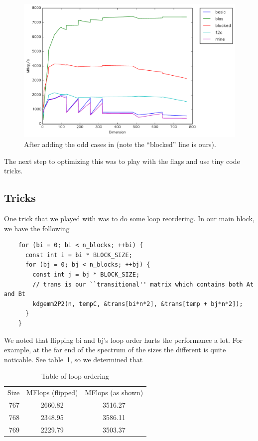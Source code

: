 \documentclass{article}
\begin{document}
  \begin{figure}[h]
    \centering
    \includegraphics[width=.7\textwidth]{odd.pdf}
    \caption{After adding the odd cases in (note the ``blocked'' line is ours).}
    \label{fig:odd}
  \end{figure}

  The next step to optimizing this was to play with the flags and use tiny code tricks.

  \subsection{Tricks}
    One trick that we played with was to do some loop reordering. In our main block, we have the following

    \begin{lstlisting}
    for (bi = 0; bi < n_blocks; ++bi) {
      const int i = bi * BLOCK_SIZE;
      for (bj = 0; bj < n_blocks; ++bj) {
        const int j = bj * BLOCK_SIZE;
        // trans is our ``transitional'' matrix which contains both At and Bt
        kdgemm2P2(n, tempC, &trans[bi*n*2], &trans[temp + bj*n*2]);
      }
    }
    \end{lstlisting}

    We noted that flipping bi and bj's loop order hurts the performance a lot. For example, at the far end of the spectrum of the sizes
    the different is quite noticable. See table~\ref{tab:looporder}, so we determined that 

    \begin{table}
      \centering
      \begin{tabular}{r c c}
        Size & MFlops (flipped) & MFlops (as shown) \\
        767  & 2660.82 & 3516.27\\
        768  & 2348.95 & 3586.11\\
        769  & 2229.79 & 3503.37
      \end{tabular}
      \caption{Table of loop ordering}
      \label{tab:looporder}
    \end{table}
\end{document}
